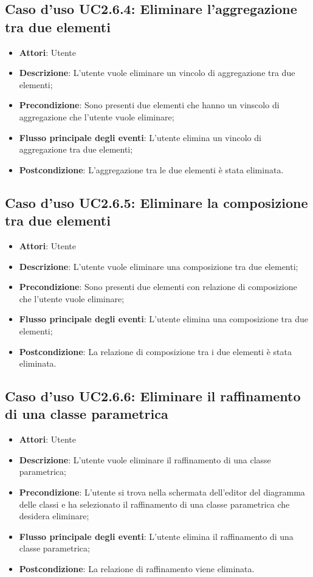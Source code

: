 \documentclass[../AnalisiDeiRequisiti.tex]{subfiles}
\begin{document}
		\subsection{Caso d'uso UC2.6.4: Eliminare l'aggregazione tra due elementi}
		\begin{itemize}
			\item \textbf{Attori}: Utente
			\item \textbf{Descrizione}: L'utente vuole eliminare un vincolo di aggregazione tra due elementi;
			\item \textbf{Precondizione}: Sono presenti due elementi che hanno un vinscolo di aggregazione che l'utente vuole eliminare;
			\item \textbf{Flusso principale degli eventi}: L'utente elimina un vincolo di aggregazione tra due elementi;
			\item \textbf{Postcondizione}: L'aggregazione tra le due elementi è stata eliminata.
		\end{itemize}
		\subsection{Caso d'uso UC2.6.5: Eliminare la composizione tra due elementi}
		\begin{itemize}
			\item \textbf{Attori}: Utente
			\item \textbf{Descrizione}: L'utente vuole eliminare una composizione tra due elementi;
			\item \textbf{Precondizione}: Sono presenti due elementi con relazione di composizione che l'utente vuole eliminare;
			\item \textbf{Flusso principale degli eventi}: L'utente elimina una composizione tra due elementi;
			\item \textbf{Postcondizione}: La relazione di composizione tra i due elementi è stata eliminata.
		\end{itemize}
		\subsection{Caso d'uso UC2.6.6: Eliminare il raffinamento di una classe parametrica}
		\begin{itemize}
			\item \textbf{Attori}: Utente
			\item \textbf{Descrizione}: L'utente vuole eliminare il raffinamento di una classe parametrica;
			\item \textbf{Precondizione}: L'utente si trova nella schermata dell'editor del diagramma delle classi e ha selezionato il raffinamento di una classe parametrica che desidera eliminare;
			\item \textbf{Flusso principale degli eventi}: L'utente elimina il raffinamento di una classe parametrica;
			\item \textbf{Postcondizione}: La relazione di raffinamento viene eliminata.
		\end{itemize}
\end{document}
